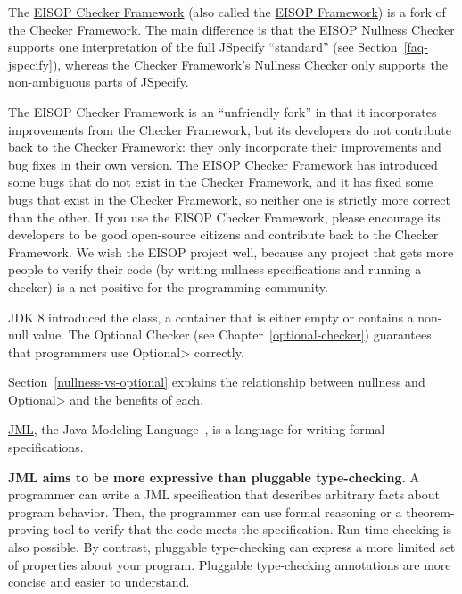 
The \href{https://github.com/eisop/checker-framework}{EISOP Checker
Framework} (also called the \href{https://eisop.github.io/}{EISOP
Framework}) is a fork of the Checker Framework.  The main difference is
that the EISOP Nullness Checker supports one interpretation of the full
JSpecify ``standard'' (see Section~\ref{faq-jspecify}), whereas the Checker
Framework's Nullness Checker only supports the non-ambiguous parts of
JSpecify.

The EISOP Checker Framework is an ``unfriendly fork'' in that it
incorporates improvements from the Checker Framework, but its developers do
not contribute back to the Checker Framework:  they only incorporate their
improvements and bug fixes in their own version.  The EISOP Checker
Framework has introduced some bugs that do not exist in the Checker
Framework, and it has fixed some bugs that exist in the Checker Framework,
so neither one is strictly more correct than the other.  If you use the
EISOP Checker Framework, please encourage its developers to be good
open-source citizens and contribute back to the Checker Framework.  We wish
the EISOP project well, because any project that gets more people to verify
their code (by writing nullness specifications and running a checker) is a
net positive for the programming community.



JDK 8 introduced the 
class, a container that is either empty or contains a non-null value.
The Optional Checker (see Chapter~\ref{optional-checker}) guarantees that
programmers use \<Optional> correctly.

Section~\ref{nullness-vs-optional} explains the relationship between
nullness and \<Optional> and the benefits of each.



\href{https://www.eecs.ucf.edu/~leavens/JML/index.shtml}{JML}, the Java Modeling
Language~\cite{LeavensBR2006:JML}, is a language for writing formal
specifications.

\textbf{JML aims to be more expressive than pluggable type-checking.}
A programmer can write a JML specification that
describes arbitrary facts about program behavior.  Then, the programmer can
use formal reasoning or a theorem-proving tool to verify that the code
meets the specification.  Run-time checking is also possible.
By contrast, pluggable type-checking can express a more limited set of
properties about your program.  Pluggable type-checking annotations are
more concise and easier to understand.


